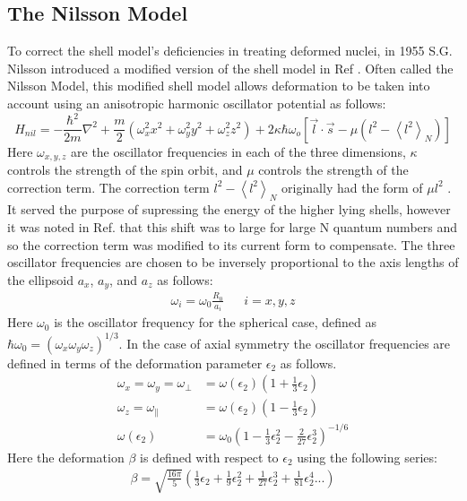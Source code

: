 \subsection{The Nilsson Model}
To correct the shell model's deficiencies in treating deformed nuclei, in 1955 S.G. Nilsson introduced a modified version of the shell model in Ref \cite{nilsson}. Often called the Nilsson Model, this modified shell model allows deformation to be taken into account using an anisotropic harmonic oscillator potential as follows:
\begin{equation}
\label{eqn:chp2-nilsson-hamil}
H_{nil}=-\frac{\hbar^{2}}{2m}\nabla^{2} + \frac{m}{2}\left(\omega_{x}^{2}x^{2} + \omega_{y}^{2}y^{2} + \omega_{z}^{2}z^{2}\right) + 2\kappa \hbar \omega_{o}\left[\vec{l}\cdot \vec{s} - \mu \left(l^{2} - \left \langle l^{2} \right \rangle_{N} \right) \right]
\end{equation} 
Here $\omega_{x,y,z}$ are the oscillator frequencies in each of the three dimensions, $\kappa$ controls the strength of the spin orbit, and $\mu$ controls the strength of the correction term. The correction term $l^2 - \left \langle l^{2} \right \rangle_{N}$ originally had the form of $\mu l^2$ \cite{nilsson}. It served the purpose of supressing the energy of the higher lying shells, however it was noted in Ref. \cite{nilssonCorrection} that this shift was to large for large N quantum numbers and so the correction term was modified to its current form to compensate. The three oscillator frequencies are chosen to be inversely proportional to the axis lengths of the ellipsoid $a_x$, $a_y$, and $a_z$ as follows:
\begin{align}
\label{eqn:chp2-nilsson-oscilator-freq}
\omega_i = \omega_0\frac{R_0}{a_i} &  & i=x,y,z
\end{align}
Here $\omega_0$ is the oscillator frequency for the spherical case, defined as $\hbar\omega_0 = (\omega_x \omega_y \omega_z )^{1/3}$. In the case of axial symmetry the oscillator frequencies are defined in terms of the deformation parameter $\epsilon_2$ as follows.
\begin{align}
\label{eqn:chp2-nilsson-oscilator-freq-components}
\omega_{x}=\omega_{y}=\omega_{\bot}&=\omega(\epsilon_2)\left(1+\frac{1}{3}\epsilon_2 \right)\\
\omega_{z}=\omega_{\parallel}&=\omega(\epsilon_2)\left(1-\frac{1}{3}\epsilon_2 \right)\\
\omega(\epsilon_2) &= \omega_0\left(1-\frac{1}{3}\epsilon_2^2-\frac{2}{27}\epsilon_2^3\right)^{-1/6}
\end{align}
Here the deformation $\beta$ is defined with respect to $\epsilon_2$ using the following series:
\begin{align}
\label{eqn:chp2-nilsson-beta-from-epsilon}
\beta = \sqrt{\frac{16 \pi}{5}}\left( \frac{1}{3}\epsilon_2 + \frac{1}{9}\epsilon_2^2 + \frac{1}{27}\epsilon_2^3 +  \frac{1}{81}\epsilon_2^4...\right)
\end{align}

